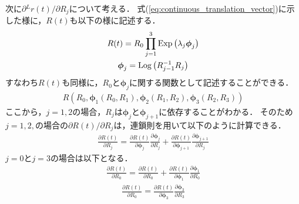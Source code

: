 次に$\partial {}^{L}r(t) / \partial R_{j}$について考える．
式(\ref{eq:continuous_translation_vector})に示した様に，$R(t)$も以下の様に記述する．
%
\begin{align}
  \begin{gathered}
  R(t) = R_{0} \prod_{j=1}^{3} {\rm Exp} \left( \lambda_{j} \boldsymbol \phi_{j} \right) \\
  \boldsymbol \phi_{j} = {\rm Log} \left( R_{j-1}^{-1} R_{j} \right)
  \end{gathered}
  \label{eq:continuous_rotation_matrix_delta}
\end{align}
%
すなわち$R(t)$も同様に，$R_{0}$と$\boldsymbol \phi_{j}$に関する関数として記述することができる．
%
\begin{align}
  R \left(
    R_{0},
    \boldsymbol \phi_{1} \left( R_{0}, R_{1} \right),
    \boldsymbol \phi_{2} \left( R_{1}, R_{2} \right),
    \boldsymbol \phi_{3} \left( R_{2}, R_{3} \right)
  \right)
\end{align}
%
ここから，$j=1,2$の場合，$R_{j}$は$\boldsymbol \phi_{j}$と$\boldsymbol \phi_{j+1}$に依存することがわかる．
そのため$j=1,2,$の場合の$\partial R(t) / \partial R_{j}$は，連鎖則を用いて以下のように計算できる．
%
\begin{align}
  \frac{ \partial R(t) }{ \partial R_{j} }
  =
  \frac{ \partial R(t) }{ \partial \boldsymbol \phi_{j} }
  \frac{ \partial \boldsymbol \phi_{j} }{ \partial R_{j} }
  +
  \frac{ \partial R(t) }{ \partial \boldsymbol \phi_{j+1} }
  \frac{ \partial \boldsymbol \phi_{j+1} }{ \partial R_{j} }
\end{align}
%
$j=0$と$j=3$の場合は以下となる．
%
\begin{align}
  \frac{ \partial R(t) }{ \partial R_{0} }
  =
  \frac{ \partial R(t) }{ \partial R_{0} }
  +
  \frac{ \partial R(t) }{ \partial \boldsymbol \phi_{1} }
  \frac{ \partial \boldsymbol \phi_{1} }{ \partial R_{0} }
\end{align}
%
\begin{align}
  \frac{ \partial R(t) }{ \partial R_{0} }
  =
  \frac{ \partial R(t) }{ \partial \boldsymbol \phi_{3} }
  \frac{ \partial \boldsymbol \phi_{3} }{ \partial R_{3} }
\end{align}

